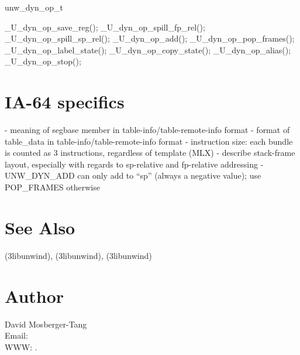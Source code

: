 \documentclass{article}
\begin{document}
unw\_dyn\_op\_t

\_U\_dyn\_op\_save\_reg();
\_U\_dyn\_op\_spill\_fp\_rel();
\_U\_dyn\_op\_spill\_sp\_rel();
\_U\_dyn\_op\_add();
\_U\_dyn\_op\_pop\_frames();
\_U\_dyn\_op\_label\_state();
\_U\_dyn\_op\_copy\_state();
\_U\_dyn\_op\_alias();
\_U\_dyn\_op\_stop();

\section{IA-64 specifics}

- meaning of segbase member in table-info/table-remote-info format
- format of table\_data in table-info/table-remote-info format
- instruction size: each bundle is counted as 3 instructions, regardless
  of template (MLX)
- describe stack-frame layout, especially with regards to sp-relative
  and fp-relative addressing
- UNW\_DYN\_ADD can only add to ``sp'' (always a negative value); use
  POP\_FRAMES otherwise

\section{See Also}

(3libunwind),
(3libunwind),
(3libunwind)

\section{Author}

\noindent
David Mosberger-Tang\\
Email: \\
WWW: .
\LatexManEnd
\end{document}
